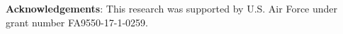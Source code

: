 \documentclass{article}
\begin{document}

\textbf{Acknowledgements}: This research was supported by U.S. Air Force under grant number FA9550-17-1-0259.

\vfill








\end{document}
